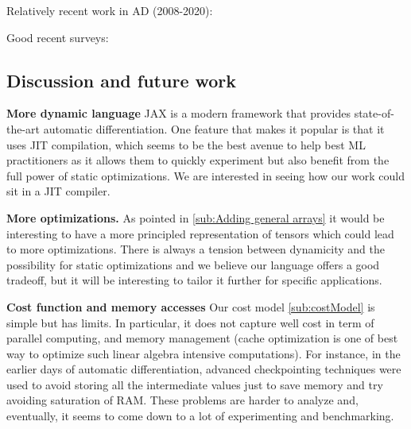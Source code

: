 Relatively recent work in AD (2008-2020):
\cite{mak2020differential,elliotthigher,vytiniotis2019differentiable,innes2018don,baydin2017automatic,huot2020correctness,gallagher-sdg,manzyuk2012confusion,wang2018demystifying,beck1994if,wang2018backpropagation,betancourt2018geometric,elliott2018simple,carpenter2015stan,paszke2017automatic,shaikhha2019efficient,innes2019zygote,griewank2008evaluating,kucukelbir2017automatic,brunel2019backpropagation,barthe2020versatility,abadi2019simple,cockett2019reverse,van2018automatic,hascoet2013tapenade,abadi2016tensorflow,pearlmutter2008reverse,bergstra2010theano,fong2019backprop,ehrhard2003differential,agrawal2019tensorflow,bettencourt2019taylor,cruttwell2017cartesian,manzyuk2012simply,laue2018computing,bernstein2020differentiating}

Good recent surveys: \cite{van2018automatic,baydin2017automatic}

\subsection{Discussion and future work} %
\label{sub:discussion_and_future_work}

\noindent \textbf{More dynamic language}
JAX \cite{bradbury2020jax,frostig2018compiling} is a modern framework that provides state-of-the-art automatic differentiation. 
One feature that makes it popular is that it uses JIT compilation, 
which seems to be the best avenue to help best ML practitioners as it allows them 
to quickly experiment but also benefit from the full power of static optimizations.
We are interested in seeing how our work could sit in a JIT compiler. 

\noindent \textbf{More optimizations.}
As pointed in \ref{sub:Adding general arrays} it would be interesting to have a more principled representation 
of tensors which could lead to more optimizations. 
There is always a tension between dynamicity and the possibility for static optimizations 
and we believe our language offers a good tradeoff, but it will be interesting to tailor it 
further for specific applications.

\noindent \textbf{Cost function and memory accesses}
Our cost model \ref{sub:costModel} is simple but has limits. 
In particular, it does not capture well cost in term of
parallel computing, and memory management (cache optimization is one of best way to optimize such linear algebra intensive computations).
For instance, in the earlier days of automatic differentiation, 
advanced checkpointing techniques were used to avoid storing all the intermediate values just to save memory 
and try avoiding saturation of RAM. 
These problems are harder to analyze and, eventually, it seems to come down to a lot of experimenting and benchmarking.


